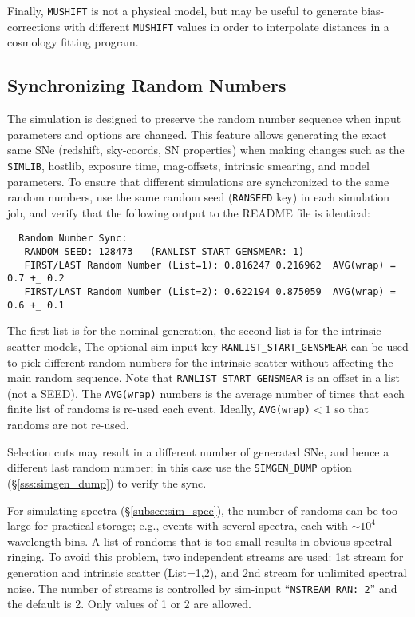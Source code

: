 \documentclass[12pt]{article}
\newcommand{\simlib}{{\tt SIMLIB}}
\newcommand{\hostlib}{{\sc hostlib}}
\begin{document}
{Finally, {\tt MUSHIFT} is not a physical model, but may be useful
to generate bias-corrections with different {\tt MUSHIFT} values
in order to interpolate distances in a cosmology fitting program.

   \clearpage
   \subsection{Synchronizing Random Numbers}
   \label{subsec:sim_ransync}

The simulation is designed to preserve the random number sequence
when input parameters and options are changed. This feature allows
generating the exact same SNe (redshift, sky-coords, SN properties)
when making changes such as the 
\simlib, \hostlib, exposure time, mag-offsets, intrinsic smearing, and 
model parameters.
To ensure that different simulations are synchronized to the
same random numbers, use the same random seed ({\tt RANSEED} key)
in each simulation job, 
and verify that the following output to the README file
is identical:
\begin{verbatim}
  Random Number Sync: 
   RANDOM SEED: 128473   (RANLIST_START_GENSMEAR: 1)
   FIRST/LAST Random Number (List=1): 0.816247 0.216962  AVG(wrap) = 0.7 +_ 0.2 
   FIRST/LAST Random Number (List=2): 0.622194 0.875059  AVG(wrap) = 0.6 +_ 0.1 
\end{verbatim}
The first list is for the nominal generation, 
the second list is for the intrinsic scatter models,
The optional sim-input key {\tt RANLIST\_START\_GENSMEAR} 
can be used to pick different random numbers for the intrinsic
scatter without affecting the main random sequence.
Note that {\tt RANLIST\_START\_GENSMEAR} is an offset 
in a list (not a SEED).
The {\tt AVG(wrap)} numbers is the average number of times
that each finite list of randoms is re-used each event.
Ideally, {\tt AVG(wrap)}$<1$ so that randoms are not re-used.

Selection cuts may result in a different number of generated
SNe, and hence a different last random number; in this case
use the {\tt SIMGEN\_DUMP} option (\S\ref{sss:simgen_dump})
to verify the sync.

For simulating spectra (\S\ref{subsec:sim_spec}), the number
of randoms can be too large for practical storage;
e.g., events with several spectra, each with $\sim 10^4$ wavelength bins.
A  list of randoms that is too small results in obvious spectral ringing.
To avoid this problem, two independent streams are used:
1st stream for generation and intrinsic scatter (List=1,2),
and 2nd stream for unlimited spectral noise. The number of
streams is controlled by sim-input ``{\tt NSTREAM\_RAN: 2}''
and the default is 2. Only values of 1 or 2 are allowed.

}
\end{document}
